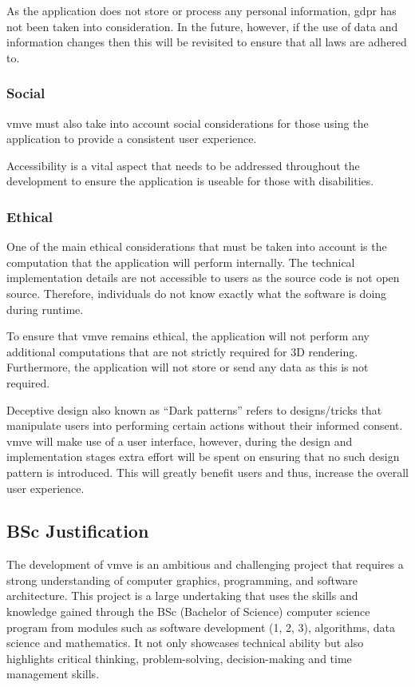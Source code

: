 \documentclass[11pt]{article}
\begin{document}
As the application does not store or process any personal information,
\gls*{gdpr} has not been taken into consideration. In the future, however, if
the use of data and information changes then this will be revisited to ensure
that all laws are adhered to.

\subsubsection{Social}
\gls*{vmve} must also take into account social considerations for those using the
application to provide a consistent user experience.

Accessibility is a vital aspect that needs to be addressed throughout the
development to ensure the application is useable for those with disabilities.

\subsubsection{Ethical}
One of the main ethical considerations that must be taken into account is the
computation that the application will perform internally. The technical
implementation details are not accessible to users as the source code is not
open source. Therefore, individuals do not know exactly what the software is
doing during runtime.

To ensure that \gls*{vmve} remains ethical, the application will not perform any
additional computations that are not strictly required for 3D rendering.
Furthermore, the application will not store or send any data as this is not
required.

Deceptive design also known as ``Dark patterns'' refers to designs/tricks that
manipulate users into performing certain actions without their informed consent.
\gls*{vmve} will make use of a user interface, however, during the design and
implementation stages extra effort will be spent on ensuring that no such design
pattern is introduced. This will greatly benefit users and thus, increase the
overall user experience.

\subsection{BSc Justification}
The development of \gls*{vmve} is an ambitious and challenging project that
requires a strong understanding of computer graphics, programming, and software
architecture. This project is a large undertaking that uses the skills and
knowledge gained through the BSc (Bachelor of Science) computer science program
from modules such as software development (1, 2, 3), algorithms, data science
and mathematics. It not only showcases technical ability but also highlights
critical thinking, problem-solving, decision-making and time management skills. 
\end{document}
